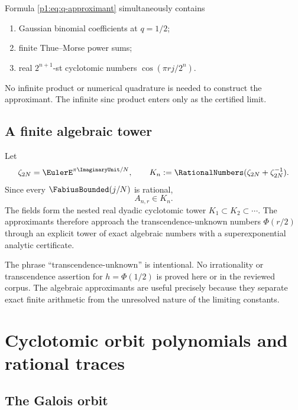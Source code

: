 \documentclass[11pt,oneside]{article}
\theoremstyle{definition}
\theoremstyle{remark}
\newcommand{\PhiU}{\Phi}
\begin{document}
\begin{remark}
Formula \eqref{p1:eq:q-approximant} simultaneously contains
\begin{enumerate}
 \item Gaussian binomial coefficients at $q=1/2$;
 \item finite Thue--Morse power sums;
 \item real $2^{n+1}$-st cyclotomic numbers
 $\cos(\pi rj/2^n)$.
\end{enumerate}
No infinite product or numerical quadrature is needed to construct the
approximant.  The infinite sinc product enters only as the certified limit.
\end{remark}

\subsection{A finite algebraic tower}

Let
\begin{equation}\label{p1:eq:cyclotomic-field}
 \zeta_{2N}=\EulerE^{\pi\ImaginaryUnit/N},
 \qquad
 K_n:=\RationalNumbers(\zeta_{2N}+\zeta_{2N}^{-1}).
\end{equation}
Since every $\FabiusBounded(j/N)$ is rational,
\begin{equation}\label{p1:eq:A-in-K}
 A_{n,r}\in K_n.
\end{equation}
The fields form the nested real dyadic cyclotomic tower
$K_1\subset K_2\subset\cdots$.  The approximants therefore approach the
transcendence-unknown numbers $\PhiU(r/2)$ through an explicit tower of exact
algebraic numbers with a superexponential analytic certificate.

\begin{remark}
The phrase ``transcendence-unknown'' is intentional.  No irrationality or
transcendence assertion for $h=\PhiU(1/2)$ is proved here or in the reviewed
corpus.  The algebraic approximants are useful precisely because they separate
exact finite arithmetic from the unresolved nature of the limiting constants.
\end{remark}

\section{Cyclotomic orbit polynomials and rational traces}\label{p1:sec:cyclotomic}

\subsection{The Galois orbit}
\end{document}
